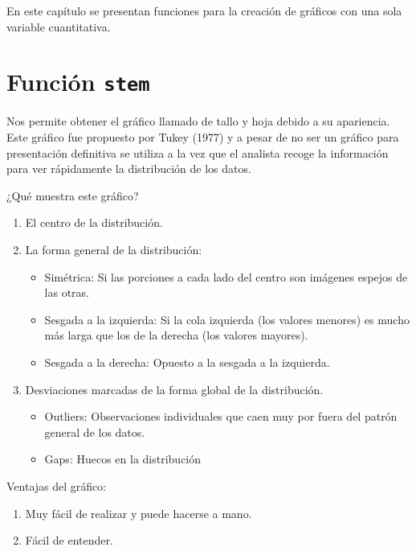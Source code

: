 \documentclass[10pt,]{krantz}
\providecommand{\tightlist}{%
  \setlength{\itemsep}{0pt}\setlength{\parskip}{0pt}}
\begin{document}
En este capítulo se presentan funciones para la creación de gráficos con
una sola variable cuantitativa.

\section{\texorpdfstring{Función
\texttt{stem}}{Función stem}}\label{funcion-stem}

Nos permite obtener el gráfico llamado de tallo y hoja debido a su
apariencia. Este gráfico fue propuesto por Tukey (1977) y a pesar de no
ser un gráfico para presentación definitiva se utiliza a la vez que el
analista recoge la información para ver rápidamente la distribución de
los datos.

¿Qué muestra este gráfico?

\begin{enumerate}
\def\labelenumi{\arabic{enumi}.}
\tightlist
\item
  El centro de la distribución.
\item
  La forma general de la distribución:

  \begin{itemize}
  \tightlist
  \item
    Simétrica: Si las porciones a cada lado del centro son imágenes
    espejos de las otras.
  \item
    Sesgada a la izquierda: Si la cola izquierda (los valores menores)
    es mucho más larga que los de la derecha (los valores mayores).
  \item
    Sesgada a la derecha: Opuesto a la sesgada a la izquierda.
  \end{itemize}
\item
  Desviaciones marcadas de la forma global de la distribución.

  \begin{itemize}
  \tightlist
  \item
    Outliers: Observaciones individuales que caen muy por fuera del
    patrón general de los datos.
  \item
    Gaps: Huecos en la distribución
  \end{itemize}
\end{enumerate}

Ventajas del gráfico:

\begin{enumerate}
\def\labelenumi{\arabic{enumi}.}
\tightlist
\item
  Muy fácil de realizar y puede hacerse a mano.
\item
  Fácil de entender.
\end{enumerate}
\end{document}
